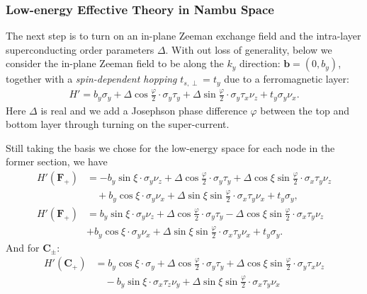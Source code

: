 \begin{subappendices}
	\subsubsection{Low-energy Effective Theory in Nambu Space}
	The next step is to turn on an in-plane Zeeman exchange field and the intra-layer superconducting order parameters $\Delta$. With out loss of generality, below we consider the in-plane Zeeman field to be along the $k_y$ direction: $\bm{b}=(0,b_y)$, together with a \emph{spin-dependent hopping} $t_{s,\perp}=t_y$ due to a ferromagnetic layer:
	\begin{align}\label{H'}
		H'=b_y\sigma_y+\Delta\cos\frac{\varphi}{2}\cdot \sigma_y\tau_y+\Delta\sin\frac{\varphi}{2}\cdot\sigma_y\tau_x\nu_z+t_y\sigma_y\nu_x.
	\end{align}
	Here $\Delta$ is real and we add a Josephson phase difference $\varphi$ between the top and bottom layer through turning on the super-current.\par
	Still taking the basis we chose for the low-energy space for each node in the former section, we have
	\begin{align}\label{H' for Q+ and Q-}
		H'(\bm{F}_+) & =-b_y\sin\xi\cdot\sigma_y\nu_z+\Delta\cos\frac{\varphi}{2}\cdot\sigma_y\tau_y+\Delta\cos\xi\sin\frac{\varphi}{2}\cdot\sigma_x\tau_y\nu_z\nonumber \\
		             & \quad+b_y\cos\xi\cdot\sigma_y\nu_x+\Delta\sin\xi\sin\frac{\varphi}{2}\cdot\sigma_x\tau_y\nu_x+t_y\sigma_y,                                        \\
		H'(\bm{F}_+) & =b_y\sin\xi\cdot\sigma_y\nu_z+\Delta\cos\frac{\varphi}{2}\cdot\sigma_y\tau_y-\Delta\cos\xi\sin\frac{\varphi}{2}\cdot\sigma_x\tau_y\nu_z\nonumber  \\
		             & +b_y\cos\xi\cdot\sigma_y\nu_x+\Delta\sin\xi\sin\frac{\varphi}{2}\cdot\sigma_x\tau_y\nu_x+t_y\sigma_y.
	\end{align}
	And for $\bm{C}_\pm$:
	\begin{align}
		H'(\bm{C}_+) & =b_y\cos\xi\cdot\sigma_y+\Delta\cos\frac{\varphi}{2}\cdot\sigma_y\tau_y+\Delta\cos\xi\sin\frac{\varphi}{2}\cdot\sigma_y\tau_x\nu_z\nonumber                                                                                          \\
		             & \quad-b_y\sin\xi\cdot\sigma_x\tau_z\nu_y+\Delta\sin\xi\sin\frac{\varphi}{2}\cdot\sigma_x\tau_y\nu_x\nonumber                                                                                                                         \\

\end{align}
\end{subappendices}
